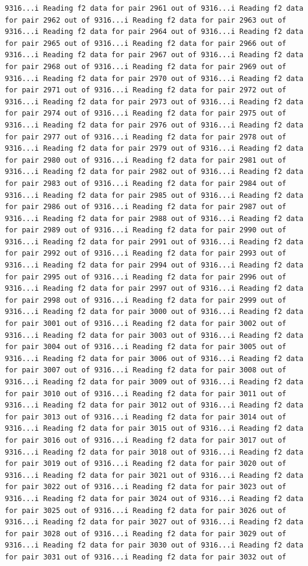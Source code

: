 \documentclass[
]{article}
\begin{document}
\begin{verbatim}
9316...i Reading f2 data for pair 2961 out of 9316...i Reading f2 data for pair 2962 out of 9316...i Reading f2 data for pair 2963 out of 9316...i Reading f2 data for pair 2964 out of 9316...i Reading f2 data for pair 2965 out of 9316...i Reading f2 data for pair 2966 out of 9316...i Reading f2 data for pair 2967 out of 9316...i Reading f2 data for pair 2968 out of 9316...i Reading f2 data for pair 2969 out of 9316...i Reading f2 data for pair 2970 out of 9316...i Reading f2 data for pair 2971 out of 9316...i Reading f2 data for pair 2972 out of 9316...i Reading f2 data for pair 2973 out of 9316...i Reading f2 data for pair 2974 out of 9316...i Reading f2 data for pair 2975 out of 9316...i Reading f2 data for pair 2976 out of 9316...i Reading f2 data for pair 2977 out of 9316...i Reading f2 data for pair 2978 out of 9316...i Reading f2 data for pair 2979 out of 9316...i Reading f2 data for pair 2980 out of 9316...i Reading f2 data for pair 2981 out of 9316...i Reading f2 data for pair 2982 out of 9316...i Reading f2 data for pair 2983 out of 9316...i Reading f2 data for pair 2984 out of 9316...i Reading f2 data for pair 2985 out of 9316...i Reading f2 data for pair 2986 out of 9316...i Reading f2 data for pair 2987 out of 9316...i Reading f2 data for pair 2988 out of 9316...i Reading f2 data for pair 2989 out of 9316...i Reading f2 data for pair 2990 out of 9316...i Reading f2 data for pair 2991 out of 9316...i Reading f2 data for pair 2992 out of 9316...i Reading f2 data for pair 2993 out of 9316...i Reading f2 data for pair 2994 out of 9316...i Reading f2 data for pair 2995 out of 9316...i Reading f2 data for pair 2996 out of 9316...i Reading f2 data for pair 2997 out of 9316...i Reading f2 data for pair 2998 out of 9316...i Reading f2 data for pair 2999 out of 9316...i Reading f2 data for pair 3000 out of 9316...i Reading f2 data for pair 3001 out of 9316...i Reading f2 data for pair 3002 out of 9316...i Reading f2 data for pair 3003 out of 9316...i Reading f2 data for pair 3004 out of 9316...i Reading f2 data for pair 3005 out of 9316...i Reading f2 data for pair 3006 out of 9316...i Reading f2 data for pair 3007 out of 9316...i Reading f2 data for pair 3008 out of 9316...i Reading f2 data for pair 3009 out of 9316...i Reading f2 data for pair 3010 out of 9316...i Reading f2 data for pair 3011 out of 9316...i Reading f2 data for pair 3012 out of 9316...i Reading f2 data for pair 3013 out of 9316...i Reading f2 data for pair 3014 out of 9316...i Reading f2 data for pair 3015 out of 9316...i Reading f2 data for pair 3016 out of 9316...i Reading f2 data for pair 3017 out of 9316...i Reading f2 data for pair 3018 out of 9316...i Reading f2 data for pair 3019 out of 9316...i Reading f2 data for pair 3020 out of 9316...i Reading f2 data for pair 3021 out of 9316...i Reading f2 data for pair 3022 out of 9316...i Reading f2 data for pair 3023 out of 9316...i Reading f2 data for pair 3024 out of 9316...i Reading f2 data for pair 3025 out of 9316...i Reading f2 data for pair 3026 out of 9316...i Reading f2 data for pair 3027 out of 9316...i Reading f2 data for pair 3028 out of 9316...i Reading f2 data for pair 3029 out of 9316...i Reading f2 data for pair 3030 out of 9316...i Reading f2 data for pair 3031 out of 9316...i Reading f2 data for pair 3032 out of 
\end{verbatim}
\end{document}
